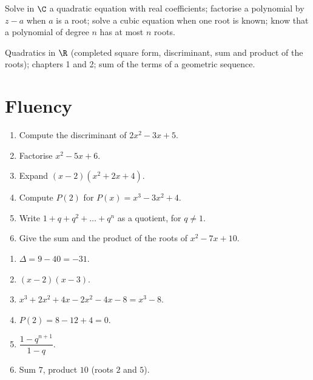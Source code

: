 
\begin{objectives}
Solve in $\C$ a quadratic equation with real coefficients; factorise a polynomial by $z-a$ when $a$ is a root; solve a cubic equation when one root is known; know that a polynomial of degree $n$ has at most $n$ roots.
\end{objectives}
\begin{prerequisites}
Quadratics in $\R$ (completed square form, discriminant, sum and product of the roots); chapters 1 and 2; sum of the terms of a geometric sequence.
\end{prerequisites}

\section{Fluency}
\begin{fluency}
\begin{enumerate}
\item Compute the discriminant of $2x^2-3x+5$.
\item Factorise $x^2-5x+6$.
\item Expand $(x-2)\left(x^2+2x+4\right)$.
\item Compute $P(2)$ for $P(x)=x^3-3x^2+4$.
\item Write $1+q+q^2+\dots+q^{n}$ as a quotient, for $q\neq1$.
\item Give the sum and the product of the roots of $x^2-7x+10$.
\end{enumerate}
\end{fluency}
\begin{solution}[Fluency]
\begin{enumerate}
\item $\Delta=9-40=-31$.
\item $(x-2)(x-3)$.
\item $x^3+2x^2+4x-2x^2-4x-8=x^3-8$.
\item $P(2)=8-12+4=0$.
\item $\dfrac{1-q^{n+1}}{1-q}$.
\item Sum $7$, product $10$ (roots $2$ and $5$).
\end{enumerate}
\end{solution}

\mxnewpage
